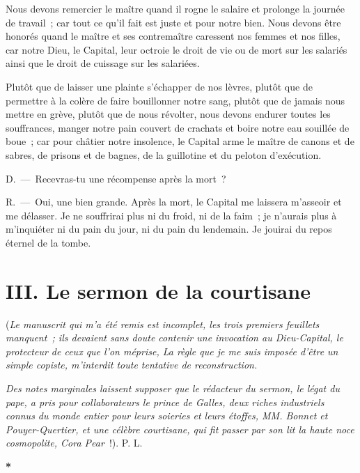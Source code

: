 \documentclass[french,twoside]{book} %
\newcommand\chapteropen{} %
\newcommand\chaptercont{} %
\newcommand\chapterclose{} %
\begin{document}
Nous devons remercier le maître quand il rogne le salaire et prolonge la journée de travail ; car tout ce qu’il fait est juste et pour notre bien. Nous devons être honorés quand le maître et ses contremaître caressent nos femmes et nos filles, car notre Dieu, le Capital, leur octroie le droit de vie ou de mort sur les salariés ainsi que le droit de cuissage sur les salariées.\par
Plutôt que de laisser une plainte s’échapper de nos lèvres, plutôt que de permettre à la colère de faire bouillonner notre sang, plutôt que de jamais nous mettre en grève, plutôt que de nous révolter, nous devons endurer toutes les souffrances, manger notre pain couvert de crachats et boire notre eau souillée de boue ; car pour châtier notre insolence, le Capital arme le maître de canons et de sabres, de prisons et de bagnes, de la guillotine et du peloton d’exécution.\par
D. — Recevras-tu une récompense après la mort ?\par
R. — Oui, une bien grande. Après la mort, le Capital me laissera m’asseoir et me délasser. Je ne souffrirai plus ni du froid, ni de la faim ; je n’aurais plus à m’inquiéter ni du pain du jour, ni du pain du lendemain. Je jouirai du repos éternel de la tombe.
\chapterclose


\chapteropen
\chapter[{III. Le sermon de la courtisane}]{III. Le sermon de la courtisane}\renewcommand{\leftmark}{III. Le sermon de la courtisane}


\chaptercont
\noindent (\emph{Le manuscrit qui m’a été remis est incomplet, les trois premiers feuillets manquent ; ils devaient sans doute contenir une invocation au Dieu-Capital, le protecteur de ceux que l’on méprise, La règle que je me suis imposée d’être un simple copiste, m’interdit toute tentative de reconstruction.}\par
\emph{Des notes marginales laissent supposer que le rédacteur du sermon, le légat du pape, a pris pour collaborateurs le prince de Galles, deux riches industriels connus du monde entier pour leurs soieries et leurs étoffes, MM. Bonnet et Pouyer-Quertier, et une célèbre courtisane, qui fit passer par son lit la haute noce cosmopolite, Cora Pear} !). P. L.\par

\begin{center}
\noindent \textbf{*}\par
\end{center}
\end{document}
